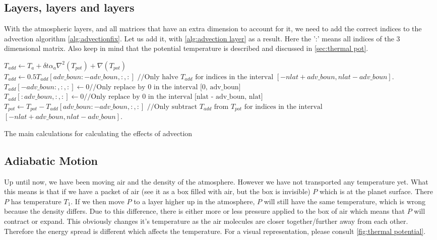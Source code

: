 \subsection{Layers, layers and layers}
With the atmospheric layers, and all matrices that have an extra dimension to account for it, we need to add the correct indices to the advection algorithm \autoref{alg:advectionfix}. Let us 
add it, with \autoref{alg:advection layer} as a result. Here the ':' means all indices of the 3 dimensional matrix. Also keep in mind that the potential temperature is described and discussed in 
\autoref{sec:thermal pot}. 

\begin{algorithm}
    $T_{add} \leftarrow T_a + \delta t \alpha_a \nabla^2(T_{pot}) + \nabla(T_{pot})$ \;
    $T_{add} \leftarrow 0.5T_{add}[adv\_boun:-adv\_boun, :, :] \text{ //Only halve } T_{add} \text{ for indices in the interval } [-nlat + adv\_boun, nlat - adv\_boun]$. \;
    $T_{add}[-adv\_boun:, :, :] \leftarrow 0 \text{//Only replace by 0 in the interval [0, adv\_boun]}$ \;
    $T_{add}[:adv\_boun, :, :] \leftarrow 0 \text{//Only replace by 0 in the interval [nlat - adv\_boun, nlat]}$ \;
    $T_{pot} \leftarrow T_{pot} - T_{add}[adv\_boun:-adv\_boun, :, :] \text{ //Only subtract } T_{add} \text{ from } T_{pot} \text{ for indices in the interval }$
        $[-nlat + adv\_boun, nlat - adv\_boun]$. \;
    \caption{The main calculations for calculating the effects of advection}
    \label{alg:advection layer}
\end{algorithm}

\subsection{Adiabatic Motion} \label{sec:thermal pot}
Up until now, we have been moving air and the density of the atmosphere. However we have not transported any temperature yet. What this means is that if we have a packet of air (see it as a box
filled with air, but the box is invisible) $P$ which is at the planet surface. There $P$ has temperature $T_1$. If we then move $P$ to a layer higher up in the atmosphere, $P$ will still have 
the same temperature, which is wrong because the density differs. Due to this difference, there is either more or less pressure applied to the box of air which means that $P$ will contract or 
expand. This obviously changes it's temperature as the air molecules are closer together/further away from each other. Therefore the energy spread is different which affects the temperature. 
For a visual representation, please consult \autoref{fig:thermal potential}.

